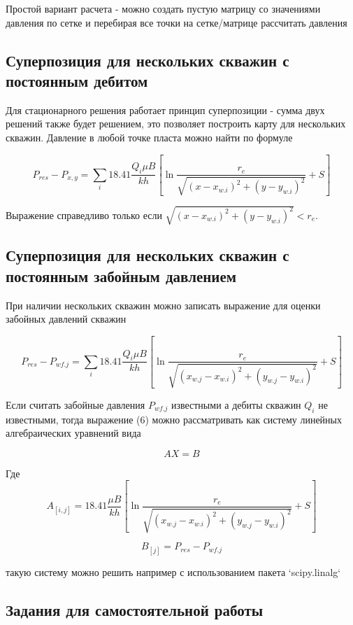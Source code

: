 Простой вариант расчета  - можно создать пустую матрицу со значениями давления по сетке и перебирая все точки на сетке/матрице рассчитать давления

\subsection{Суперпозиция для нескольких скважин с постоянным дебитом} 

Для стационарного решения работает принцип суперпозиции - сумма двух решений также будет решением, это позволяет построить карту для нескольких скважин.
Давление в любой точке пласта можно найти по формуле

\begin{equation}
	P_{res} - P_{x,y} =  \sum_{i} 18.41\dfrac{ Q_i\mu B }{kh} \left[ \ln\frac{r_e}{\sqrt{ (x-x_{w.i})^2 + (y-y_{w.i})^2 }} +S \right]
\end{equation}

Выражение справедливо только если $\sqrt{ (x-x_{w.i})^2 + (y-y_{w.i})^2 }< r_e$.

\subsection{Суперпозиция для нескольких скважин с постоянным забойным давлением}

При наличии нескольких скважин можно записать выражение для оценки забойных давлений скважин


$$
P_{res} - P_{wf.j} =  \sum_{i} 18.41\dfrac{ Q_i\mu B }{kh} \left[ \ln\dfrac{r_e}{\sqrt{ (x_{w.j}-x_{w.i})^2 + (y_{w.j}-y_{w.i})^2 }} +S \right]
$$

Если считать забойные давления $P_{wf.j}$ известными а дебиты скважин $Q_i$ не известными, тогда выражение (6) можно рассматривать как систему линейных алгебраических уравнений вида

$$AX = B$$

Где
$$
A_{[i,j]} = 18.41\dfrac{ \mu B }{kh} \left[ \ln\dfrac{r_e}{\sqrt{ (x_{w.j}-x_{w.i})^2 + (y_{w.j}-y_{w.i})^2 }} +S \right]
$$

$$
B_{[j]}=P_{res} - P_{wf.j}
$$

такую систему можно решить например с использованием пакета `scipy.linalg` 

\subsection{Задания для самостоятельной работы}

